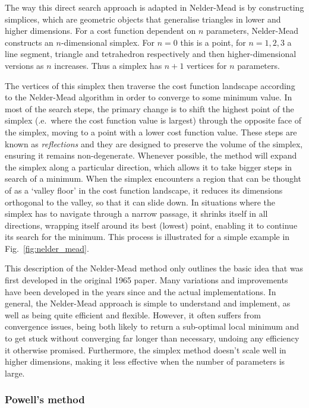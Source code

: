 The way this direct search approach is adapted in Nelder-Mead is by constructing simplices, which are geometric objects that generalise triangles in lower and higher dimensions. For a cost function dependent on $n$ parameters, Nelder-Mead constructs an $n$-dimensional simplex. For $n=0$ this is a point, for $n=1,2,3$ a line segment, triangle and tetrahedron respectively and then higher-dimensional versions as $n$ increases. Thus a simplex has $n+1$ vertices for $n$ parameters. 

The vertices of this simplex then traverse the cost function landscape according to the Nelder-Mead algorithm in order to converge to some minimum value.  In most of the search steps, the primary change is to shift the highest point of the simplex (\@i.e.~where the cost function value is largest) through the opposite face of the simplex, moving to a point with a lower cost function value. These steps are known as \emph{reflections} and they are designed to preserve the volume of the simplex, ensuring it remains non-degenerate. Whenever possible, the method will expand the simplex along a particular direction, which allows it to take bigger steps in search of a minimum. When the simplex encounters a region that can be thought of as a `valley floor' in the cost function landscape, it reduces its dimensions orthogonal to the valley, so that it can slide down. In situations where the simplex has to navigate through a narrow passage, it shrinks itself in all directions, wrapping itself around its best (lowest) point, enabling it to continue its search for the minimum. This process is illustrated for a simple example in Fig.~\ref{fig:nelder_mead}.

This description of the Nelder-Mead method only outlines the basic idea that was first developed in the original 1965 paper. Many variations and improvements have been developed in the years since and the actual implementations. In general, the Nelder-Mead approach is simple to understand and implement, as well as being quite efficient and flexible. However, it often suffers from convergence issues, being both likely to return a sub-optimal local minimum and to get stuck without converging far longer than necessary, undoing any efficiency it otherwise promised. Furthermore, the simplex method doesn't scale well in higher dimensions, making it less effective when the number of parameters is large.

\subsubsection{Powell's method}\label{sec:3.1.3.2_Powell}

